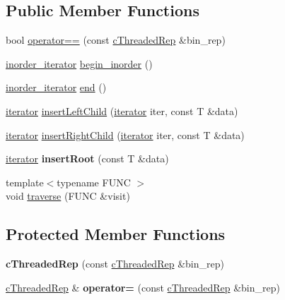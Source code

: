 \subsection*{Public Member Functions}
\begin{DoxyCompactItemize}
\item 
bool \hyperlink{classtree_1_1cThreadedRep_a462ebaa3cc1325d075bf8ac280f65a9b}{operator==} (const \hyperlink{classtree_1_1cThreadedRep}{c\-Threaded\-Rep} \&bin\-\_\-rep)
\item 
\hyperlink{classtree_1_1btree__inorder__iterator}{inorder\-\_\-iterator} \hyperlink{classtree_1_1cThreadedRep_aecd82c23c72edb946467838b46d37f86}{begin\-\_\-inorder} ()
\item 
\hyperlink{classtree_1_1btree__inorder__iterator}{inorder\-\_\-iterator} \hyperlink{classtree_1_1cThreadedRep_a8c420c636dc2ec5385edc6e514d739ff}{end} ()
\item 
\hyperlink{classtree_1_1btree__iterator}{iterator} \hyperlink{classtree_1_1cThreadedRep_ae4ba780c69109062000b5bad7b382e15}{insert\-Left\-Child} (\hyperlink{classtree_1_1btree__iterator}{iterator} iter, const T \&data)
\item 
\hyperlink{classtree_1_1btree__iterator}{iterator} \hyperlink{classtree_1_1cThreadedRep_af2e67bf601d8d1d55b83c05d1162b7e2}{insert\-Right\-Child} (\hyperlink{classtree_1_1btree__iterator}{iterator} iter, const T \&data)
\item 
\hypertarget{classtree_1_1cThreadedRep_aa41d7c0738b86fa1efcd5c0a9d5bc2a1}{\hyperlink{classtree_1_1btree__iterator}{iterator} {\bfseries insert\-Root} (const T \&data)}\label{classtree_1_1cThreadedRep_aa41d7c0738b86fa1efcd5c0a9d5bc2a1}

\item 
{\footnotesize template$<$typename F\-U\-N\-C $>$ }\\void \hyperlink{classtree_1_1cThreadedRep_a93489947fed29ed25fbb7268cbae049d}{traverse} (F\-U\-N\-C \&visit)
\end{DoxyCompactItemize}
\subsection*{Protected Member Functions}
\begin{DoxyCompactItemize}
\item 
\hypertarget{classtree_1_1cThreadedRep_a0b6f3dbf4b6f24795563bed2fea6a7e5}{{\bfseries c\-Threaded\-Rep} (const \hyperlink{classtree_1_1cThreadedRep}{c\-Threaded\-Rep} \&bin\-\_\-rep)}\label{classtree_1_1cThreadedRep_a0b6f3dbf4b6f24795563bed2fea6a7e5}

\item 
\hypertarget{classtree_1_1cThreadedRep_ad872e3bf5a20f7b7ce0e0148edf682cf}{\hyperlink{classtree_1_1cThreadedRep}{c\-Threaded\-Rep} \& {\bfseries operator=} (const \hyperlink{classtree_1_1cThreadedRep}{c\-Threaded\-Rep} \&bin\-\_\-rep)}\label{classtree_1_1cThreadedRep_ad872e3bf5a20f7b7ce0e0148edf682cf}

\end{DoxyCompactItemize}
